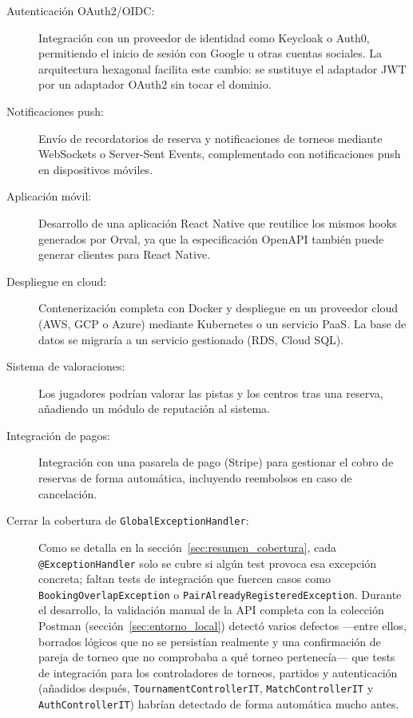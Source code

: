 \begin{description}
  \item[Autenticación OAuth2/OIDC:] Integración con un proveedor de identidad
    como Keycloak o Auth0, permitiendo el inicio de sesión con Google u otras
    cuentas sociales. La arquitectura hexagonal facilita este cambio: se sustituye
    el adaptador JWT por un adaptador OAuth2 sin tocar el dominio.

  \item[Notificaciones push:] Envío de recordatorios de reserva y notificaciones
    de torneos mediante WebSockets o Server-Sent Events, complementado con
    notificaciones push en dispositivos móviles.

  \item[Aplicación móvil:] Desarrollo de una aplicación React Native que reutilice
    los mismos hooks generados por Orval, ya que la especificación OpenAPI también
    puede generar clientes para React Native.

  \item[Despliegue en cloud:] Contenerización completa con Docker y despliegue
    en un proveedor cloud (AWS, GCP o Azure) mediante Kubernetes o un servicio
    PaaS. La base de datos se migraría a un servicio gestionado (RDS, Cloud SQL).

  \item[Sistema de valoraciones:] Los jugadores podrían valorar las pistas y los
    centros tras una reserva, añadiendo un módulo de reputación al sistema.

  \item[Integración de pagos:] Integración con una pasarela de pago (Stripe) para
    gestionar el cobro de reservas de forma automática, incluyendo reembolsos
    en caso de cancelación.

  \item[Cerrar la cobertura de \texttt{GlobalExceptionHandler}:] Como se
    detalla en la sección~\ref{sec:resumen_cobertura}, cada
    \texttt{@ExceptionHandler} solo se cubre si algún test provoca esa
    excepción concreta; faltan tests de integración que fuercen casos como
    \texttt{BookingOverlapException} o \texttt{PairAlreadyRegisteredException}.
    Durante el desarrollo, la validación manual de la API completa con la
    colección Postman (sección~\ref{sec:entorno_local}) detectó varios
    defectos —entre ellos, borrados lógicos que no se persistían realmente y
    una confirmación de pareja de torneo que no comprobaba a qué torneo
    pertenecía— que tests de integración para los controladores de torneos,
    partidos y autenticación (añadidos después,
    \texttt{TournamentControllerIT}, \texttt{MatchControllerIT} y
    \texttt{AuthControllerIT}) habrían detectado de forma automática mucho
    antes.
\end{description}
